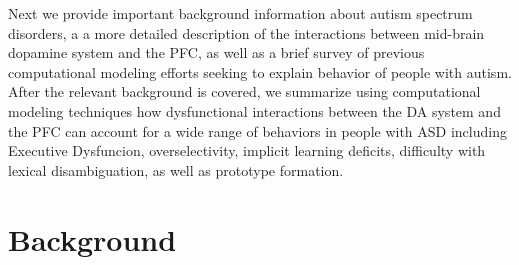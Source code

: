 \documentclass[man]{apa}
\begin{document}

Next we provide important background information about autism spectrum disorders, a a more detailed description of the interactions between mid-brain dopamine system and the PFC, as well as a brief survey of previous computational modeling efforts seeking to explain behavior of people with autism.  After the relevant background is covered, we summarize using computational modeling techniques how dysfunctional interactions between the DA system and the PFC can account for a wide range of behaviors in people with ASD including Executive Dysfuncion, overselectivity, implicit learning deficits, difficulty with lexical disambiguation, as well as prototype formation.  

\section{Background}
\end{document}
